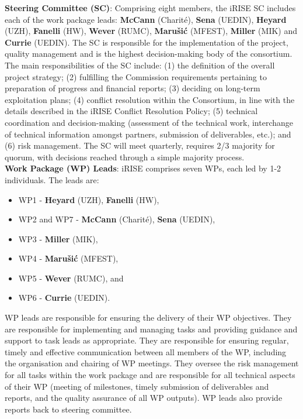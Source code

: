 \documentclass[
]{article}
\providecommand{\tightlist}{%
  \setlength{\itemsep}{0pt}\setlength{\parskip}{0pt}}
\begin{document}
\textbf{Steering Committee (SC)}: Comprising eight members, the iRISE SC
includes each of the work package leads: \textbf{McCann} (Charité), \textbf{Sena}
(UEDIN), \textbf{Heyard} (UZH), \textbf{Fanelli} (HW), \textbf{Wever} (RUMC),
\textbf{Marušić} (MFEST), \textbf{Miller} (MIK) and \textbf{Currie} (UEDIN). The SC is
responsible for the implementation of the project, quality management
and is the highest decision-making body of the consortium. The main
responsibilities of the SC include: (1) the definition of the overall
project strategy; (2) fulfilling the Commission requirements pertaining
to preparation of progress and financial reports; (3) deciding on
long-term exploitation plans; (4) conflict resolution within the
Consortium, in line with the details described in the iRISE Conflict
Resolution Policy; (5) technical coordination and decision-making
(assessment of the technical work, interchange of technical information
amongst partners, submission of deliverables, etc.); and (6) risk
management. The SC will meet quarterly, requires 2/3 majority for
quorum, with decisions reached through a simple majority process.\\

\textbf{Work Package (WP) Leads}: iRISE comprises seven WPs, each led by 1-2
individuals. The leads are:\\

\begin{itemize}
\tightlist
\item
  WP1 - \textbf{Heyard} (UZH), \textbf{Fanelli} (HW),
\item
  WP2 and WP7 - \textbf{McCann} (Charité), \textbf{Sena} (UEDIN),
\item
  WP3 - \textbf{Miller} (MIK),
\item
  WP4 - \textbf{Marušić} (MFEST),
\item
  WP5 - \textbf{Wever} (RUMC), and
\item
  WP6 - \textbf{Currie} (UEDIN).
\end{itemize}

WP leads are responsible for ensuring the delivery of their WP
objectives. They are responsible for implementing and managing tasks and
providing guidance and support to task leads as appropriate. They are
responsible for ensuring regular, timely and effective communication
between all members of the WP, including the organisation and chairing
of WP meetings. They oversee the risk management for all tasks within
the work package and are responsible for all technical aspects of their
WP (meeting of milestones, timely submission of deliverables and
reports, and the quality assurance of all WP outputs). WP leads also
provide reports back to steering committee.\\
\end{document}
